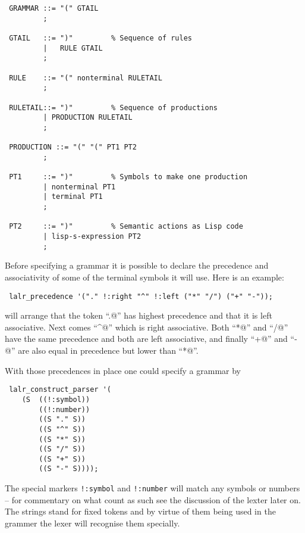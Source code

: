 \begin{verbatim}
 GRAMMAR ::= "(" GTAIL
         ;

 GTAIL   ::= ")"         % Sequence of rules
         |   RULE GTAIL
         ;

 RULE    ::= "(" nonterminal RULETAIL
         ;

 RULETAIL::= ")"         % Sequence of productions
         | PRODUCTION RULETAIL
         ;

 PRODUCTION ::= "(" "(" PT1 PT2
         ;

 PT1     ::= ")"         % Symbols to make one production
         | nonterminal PT1
         | terminal PT1
         ;

 PT2     ::= ")"         % Semantic actions as Lisp code
         | lisp-s-expression PT2
         ; 
\end{verbatim}

\hypertarget{function:LALR_PRECEDENCE}{}
Before specifying a grammar it is possible to declare the precedence and
associativity of some of the terminal symbols it will use. Here is an
example:
\begin{verbatim}
 lalr_precedence '("." !:right "^" !:left ("*" "/") ("+" "-"));
\end{verbatim}
\noindent will arrange that the token ``\verb@.@'' has highest precedence
and that it is left associative. Next comes ``\verb@^@'' which is right
associative.
Both ``\verb@*@'' and ``\verb@/@'' have the same precedence and both are
left associative, and finally ``\verb@+@'' and ``\verb@-@'' are also equal
in precedence but lower than ``\verb@*@''.

\hypertarget{function:LALR_CONSTRUCT_PARSER}{}
With those precedences in place one could specify a grammar by
\begin{verbatim}
 lalr_construct_parser '(
    (S  ((!:symbol))
        ((!:number))
        ((S "." S))
        ((S "^" S))
        ((S "*" S))
        ((S "/" S))
        ((S "+" S))
        ((S "-" S))));
\end{verbatim}

The special markers \verb+!:symbol+ and \verb+!:number+ will match any
symbols or numbers -- for commentary on what count as such see the discussion
of the lexter later on. The strings stand for fixed tokens and by virtue
of them being used in the grammer the lexer will recognise them specially.

